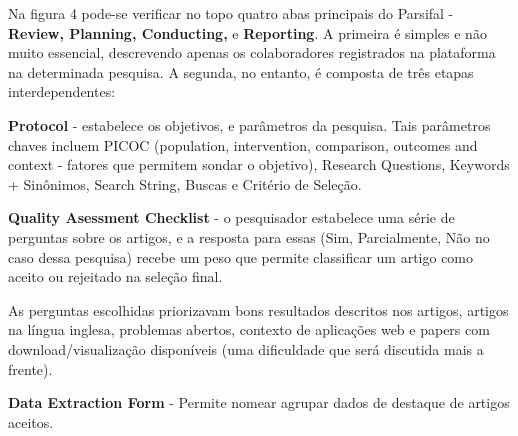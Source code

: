\bigskip

Na figura 4 pode-se verificar no topo quatro abas principais do Parsifal - \textbf{Review, Planning, Conducting, }e \textbf{Reporting}. A primeira é simples e não muito essencial, descrevendo apenas os colaboradores registrados na plataforma na determinada pesquisa. A segunda, no entanto, é composta de três etapas interdependentes:

\begin{alineas}

\item \textbf{Protocol} - estabelece os objetivos, e parâmetros da pesquisa. Tais parâmetros chaves incluem PICOC (population, intervention, comparison, outcomes and context - fatores que permitem sondar o objetivo), Research Questions, Keywords + Sinônimos, Search String, Buscas e Critério de Seleção.

\item \textbf{Quality Asessment Checklist} - o pesquisador estabelece uma série de perguntas sobre os artigos, e a resposta para essas (Sim, Parcialmente, Não no caso dessa pesquisa) recebe um peso que permite classificar um artigo como aceito ou rejeitado na seleção final. 

As perguntas escolhidas priorizavam bons resultados descritos nos artigos, artigos na língua inglesa, problemas abertos, contexto de aplicações web e papers com download/visualização disponíveis (uma dificuldade que será discutida mais a frente).

\item \textbf{Data Extraction Form} - Permite nomear agrupar dados de destaque de artigos aceitos.

\end{alineas}

